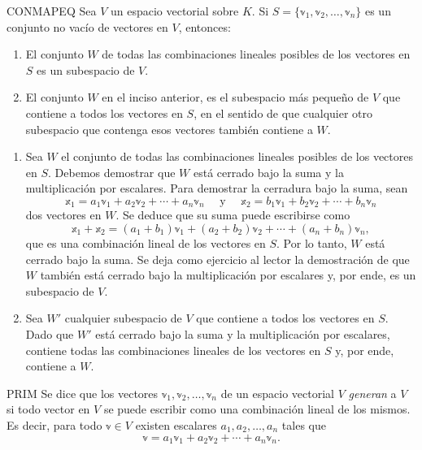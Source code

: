\begin{theorem}{}{CONMAPEQ}
    Sea $V$ un espacio vectorial sobre $K$. Si $S = \{\mathbb{v}_1, \mathbb{v}_2, \dots, \mathbb{v}_n\}$ es un conjunto no vacío de vectores en $V$, entonces:
    \begin{enumerate}[label=\alph*), topsep=6pt, itemsep=0pt]
        \item El conjunto $W$ de todas las combinaciones lineales posibles de los vectores en $S$ es un subespacio de $V$.
        \item El conjunto $W$ en el inciso anterior, es el subespacio más pequeño de $V$ que contiene a todos los vectores en $S$, en el sentido de que cualquier otro subespacio que contenga esos vectores también contiene a $W$.
    \end{enumerate}

    \tcblower
    \demostracion
    \begin{enumerate}[label=\alph*), topsep=6pt, itemsep=0pt]
        \item Sea $W$ el conjunto de todas las combinaciones lineales posibles de los vectores en $S$. Debemos demostrar que $W$ está cerrado bajo la suma y la multiplicación por escalares. Para demostrar la cerradura bajo la suma, sean
        $$\mathbb{x}_1 = a_1\mathbb{v}_1 + a_2\mathbb{v}_2 + \cdots + a_n\mathbb{v}_n \quad \text{ y } \quad \mathbb{x}_2 = b_1\mathbb{v}_1 + b_2\mathbb{v}_2 + \cdots + b_n\mathbb{v}_n$$
        dos vectores en $W$. Se deduce que su suma puede escribirse como
        $$\mathbb{x}_1 + \mathbb{x}_2 = (a_1 + b_1) \mathbb{v}_1 + (a_2 + b_2) \mathbb{v}_2 + \cdots + (a_n + b_n) \mathbb{v}_n,$$
        que es una combinación lineal de los vectores en $S$. Por lo tanto, $W$ está cerrado bajo la suma. Se deja como ejercicio al lector la demostración de que $W$ también está cerrado bajo la multiplicación por escalares y, por ende, es un subespacio de $V$.
        \item Sea $W'$ cualquier subespacio de $V$ que contiene a todos los vectores en $S$. Dado que $W'$ está cerrado bajo la suma y la multiplicación por escalares, contiene todas las combinaciones lineales de los vectores en $S$ y, por ende, contiene a $W$.
    \end{enumerate}
\end{theorem}

\newpage

\begin{definicion}{}{PRIM}
    Se dice que los vectores $\mathbb{v}_1, \mathbb{v}_2, \dots, \mathbb{v}_n$ de un espacio vectorial $V$ \emph{generan} a $V$ si todo vector en $V$ se puede escribir como una combinación lineal de los mismos. Es decir, para todo $\mathbb{v} \in V$ existen escalares $a_1, a_2, \dots, a_n$ tales que
    $$\mathbb{v} = a_1\mathbb{v}_1 + a_2\mathbb{v}_2 + \cdots + a_n\mathbb{v}_n.$$
\end{definicion}

